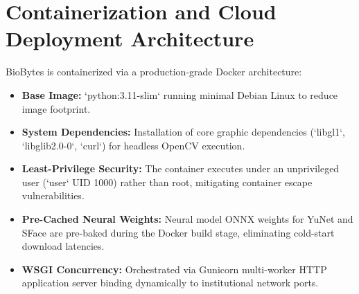 \section{Containerization and Cloud Deployment Architecture}
BioBytes is containerized via a production-grade Docker architecture:
\begin{itemize}
    \item \textbf{Base Image:} `python:3.11-slim` running minimal Debian Linux to reduce image footprint.
    \item \textbf{System Dependencies:} Installation of core graphic dependencies (`libgl1`, `libglib2.0-0`, `curl`) for headless OpenCV execution.
    \item \textbf{Least-Privilege Security:} The container executes under an unprivileged user (`user` UID 1000) rather than root, mitigating container escape vulnerabilities.
    \item \textbf{Pre-Cached Neural Weights:} Neural model ONNX weights for YuNet and SFace are pre-baked during the Docker build stage, eliminating cold-start download latencies.
    \item \textbf{WSGI Concurrency:} Orchestrated via Gunicorn multi-worker HTTP application server binding dynamically to institutional network ports.
\end{itemize}
